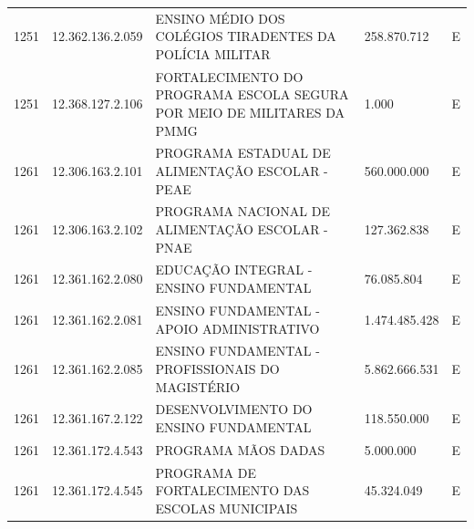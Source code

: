\documentclass{article}
\begin{document}
\begin{longtable}[c]{m{1cm}|m{2cm}|m{10cm}|m{2cm}|m{1cm}}
\multicolumn{1}{C{1cm}|}{1251} & \multicolumn{1}{C{2cm}|}{12.362.136.2.059} & \multicolumn{1}{L{10cm}|}{ENSINO MÉDIO DOS COLÉGIOS TIRADENTES DA POLÍCIA MILITAR} & \multicolumn{1}{R{2cm}|}{258.870.712} & \multicolumn{1}{C{1cm}}{E} \\
\multicolumn{1}{C{1cm}|}{1251} & \multicolumn{1}{C{2cm}|}{12.368.127.2.106} & \multicolumn{1}{L{10cm}|}{FORTALECIMENTO DO PROGRAMA ESCOLA SEGURA POR MEIO DE MILITARES DA PMMG} & \multicolumn{1}{R{2cm}|}{1.000} & \multicolumn{1}{C{1cm}}{E} \\
\multicolumn{1}{C{1cm}|}{1261} & \multicolumn{1}{C{2cm}|}{12.306.163.2.101} & \multicolumn{1}{L{10cm}|}{PROGRAMA ESTADUAL DE ALIMENTAÇÃO ESCOLAR - PEAE} & \multicolumn{1}{R{2cm}|}{560.000.000} & \multicolumn{1}{C{1cm}}{E} \\
\multicolumn{1}{C{1cm}|}{1261} & \multicolumn{1}{C{2cm}|}{12.306.163.2.102} & \multicolumn{1}{L{10cm}|}{PROGRAMA NACIONAL DE ALIMENTAÇÃO ESCOLAR - PNAE} & \multicolumn{1}{R{2cm}|}{127.362.838} & \multicolumn{1}{C{1cm}}{E} \\
\multicolumn{1}{C{1cm}|}{1261} & \multicolumn{1}{C{2cm}|}{12.361.162.2.080} & \multicolumn{1}{L{10cm}|}{EDUCAÇÃO INTEGRAL - ENSINO FUNDAMENTAL} & \multicolumn{1}{R{2cm}|}{76.085.804} & \multicolumn{1}{C{1cm}}{E} \\
\multicolumn{1}{C{1cm}|}{1261} & \multicolumn{1}{C{2cm}|}{12.361.162.2.081} & \multicolumn{1}{L{10cm}|}{ENSINO FUNDAMENTAL - APOIO ADMINISTRATIVO} & \multicolumn{1}{R{2cm}|}{1.474.485.428} & \multicolumn{1}{C{1cm}}{E} \\
\multicolumn{1}{C{1cm}|}{1261} & \multicolumn{1}{C{2cm}|}{12.361.162.2.085} & \multicolumn{1}{L{10cm}|}{ENSINO FUNDAMENTAL - PROFISSIONAIS DO MAGISTÉRIO} & \multicolumn{1}{R{2cm}|}{5.862.666.531} & \multicolumn{1}{C{1cm}}{E} \\
\multicolumn{1}{C{1cm}|}{1261} & \multicolumn{1}{C{2cm}|}{12.361.167.2.122} & \multicolumn{1}{L{10cm}|}{DESENVOLVIMENTO DO ENSINO FUNDAMENTAL} & \multicolumn{1}{R{2cm}|}{118.550.000} & \multicolumn{1}{C{1cm}}{E} \\
\multicolumn{1}{C{1cm}|}{1261} & \multicolumn{1}{C{2cm}|}{12.361.172.4.543} & \multicolumn{1}{L{10cm}|}{PROGRAMA MÃOS DADAS} & \multicolumn{1}{R{2cm}|}{5.000.000} & \multicolumn{1}{C{1cm}}{E} \\
\multicolumn{1}{C{1cm}|}{1261} & \multicolumn{1}{C{2cm}|}{12.361.172.4.545} & \multicolumn{1}{L{10cm}|}{PROGRAMA DE FORTALECIMENTO DAS ESCOLAS MUNICIPAIS} & \multicolumn{1}{R{2cm}|}{45.324.049} & \multicolumn{1}{C{1cm}}{E} \\

\end{longtable}
\end{document}
